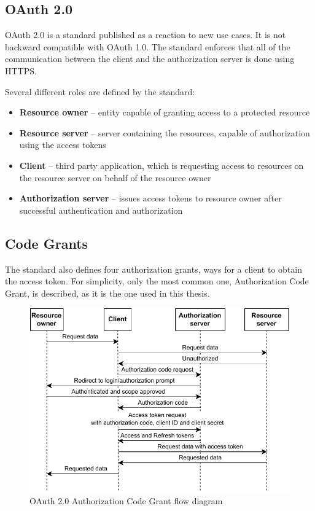 \subsection{OAuth 2.0}
OAuth 2.0 is a standard published as a reaction to new use cases. It is not backward compatible with OAuth 1.0. The standard enforces that all of the communication between the client and the authorization server is done using HTTPS.

Several different roles are defined by the standard:
\begin{itemize}
  \item \textbf{Resource owner} -- entity capable of granting access to a protected resource
  \item \textbf{Resource server} -- server containing the resources, capable of authorization using the access tokens
  \item \textbf{Client} -- third party application, which is requesting access to resources on the resource server on behalf of the resource owner
  \item \textbf{Authorization server} -- issues access tokens to resource owner after successful authentication and authorization
\end{itemize}

\subsection*{Code Grants}
\label{section:code_grants}
The standard also defines four authorization grants, ways for a client to obtain the access token. For simplicity, only the most common one, Authorization Code Grant, is described, as it is the one used in this thesis.

\begin{figure}[hbt]
  \centering
  \includegraphics[width=.8 \linewidth]{figures/auth-sequence-auth-code.pdf}
  \caption{OAuth 2.0 Authorization Code Grant flow diagram}
  \label{fig:oauth2_auth_code_grant}
\end{figure}


